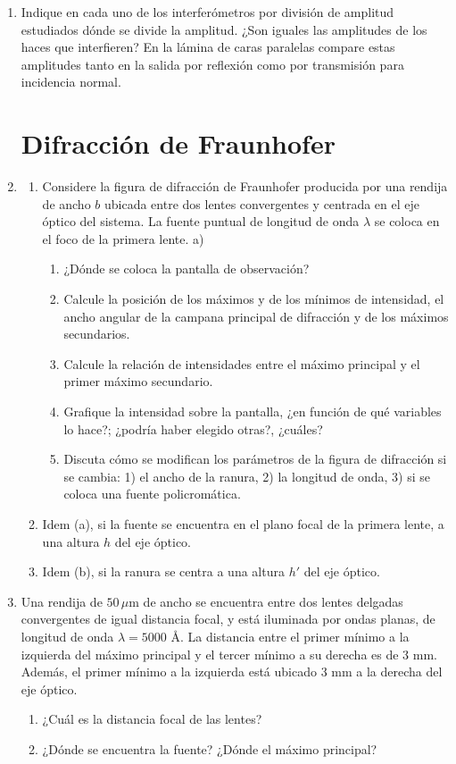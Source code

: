 \documentclass[11pt,spanish,a4paper]{article}
\begin{document}
\begin{enumerate}
\item Indique en cada uno de los interferómetros por división de amplitud
estudiados dónde se divide la amplitud. ¿Son iguales las amplitudes
de los haces que interfieren? En la lámina de caras paralelas compare
estas amplitudes tanto en la salida por reflexión como por transmisión
para incidencia normal.



\section*{Difracción de Fraunhofer}
\item
\begin{enumerate}
\item Considere la figura de difracción de Fraunhofer producida por una
rendija de ancho $b$ ubicada entre dos lentes convergentes y centrada
en el eje óptico del sistema. La fuente puntual de longitud de onda
$\lambda$ se coloca en el foco de la primera lente. a) 

\begin{enumerate}
\item ¿Dónde se coloca la pantalla de observación?
\item Calcule la posición de los máximos y de los mínimos de intensidad,
el ancho angular de la campana principal de difracción y de los máximos
secundarios. 
\item Calcule la relación de intensidades entre el máximo principal y el
primer máximo secundario. 
\item Grafique la intensidad sobre la pantalla, ¿en función de qué variables
lo hace?; ¿podría haber elegido otras?, ¿cuáles?
\item Discuta cómo se modifican los parámetros de la figura de difracción
si se cambia: 1) el ancho de la ranura, 2) la longitud de onda, 3)
si se coloca una fuente policromática. 
\end{enumerate}
\item Idem (a), si la fuente se encuentra en el plano focal de la primera
lente, a una altura $h$ del eje óptico. 
\item Idem (b), si la ranura se centra a una altura $h'$ del eje óptico. 
\end{enumerate}



\item Una rendija de $50\,\mu$m de ancho se encuentra entre dos lentes
delgadas convergentes de igual distancia focal, y está iluminada por
ondas planas, de longitud de onda $\lambda=5000$ Å. La distancia
entre el primer mínimo a la izquierda del máximo principal y el tercer
mínimo a su derecha es de 3 mm. Además, el primer mínimo a la izquierda
está ubicado 3 mm a la derecha del eje óptico.
\begin{enumerate}
\item ¿Cuál es la distancia focal de las lentes? 
\item ¿Dónde se encuentra la fuente? ¿Dónde el máximo principal? 
\end{enumerate}



\end{enumerate}
\end{document}
